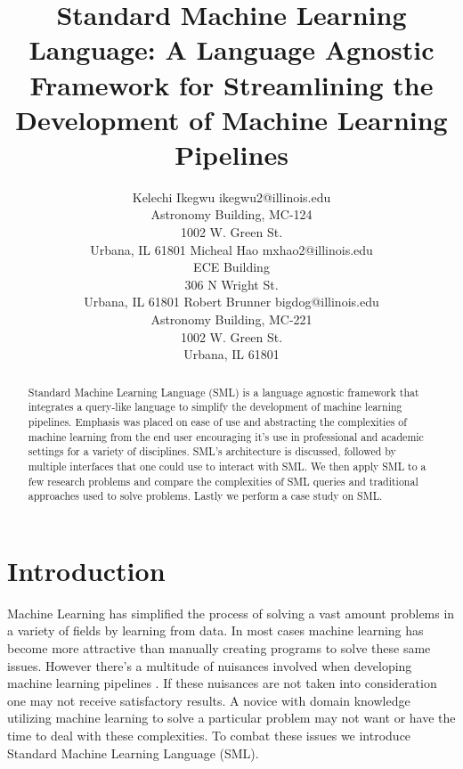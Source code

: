 \documentclass[jair,twoside,11pt,theapa]{article}
\begin{document}
\title{Standard Machine Learning Language: A Language Agnostic Framework for Streamlining the Development of Machine Learning Pipelines}

\author{\name Kelechi Ikegwu \email ikegwu2@illinois.edu \\
        Astronomy Building, MC-124 \\1002 W. Green St.\\ Urbana, IL  61801
       \AND
       \name Micheal Hao  \email mxhao2@illinois.edu \\
       \addr ECE Building \\306 N Wright St. \\ Urbana, IL 61801
       \AND
       \name Robert Brunner \email bigdog@illinois.edu\\
        Astronomy Building, MC-221 \\1002 W. Green St.\\ Urbana, IL  61801}


\maketitle


\begin{abstract}
Standard Machine Learning Language (SML) is a language agnostic framework that integrates a query-like language to simplify the development of machine learning pipelines. Emphasis was placed on ease of use and abstracting the complexities of machine learning from the end user encouraging it's use in professional and academic settings for a variety of disciplines. SML's architecture is discussed, followed by multiple interfaces that one could use to interact with SML. We then apply SML to a few research problems and compare the complexities of SML queries and traditional approaches used to solve problems. Lastly we perform a case study on SML.
\end{abstract}

\section{Introduction}
\label{Introduction}

Machine Learning has simplified the process of solving a vast amount problems in a variety of fields by learning from data. In most cases machine learning has become more attractive than manually creating programs to solve these same issues. However there's a multitude of nuisances involved when developing machine learning pipelines \cite{pedros:fewUsefulThings}. If these nuisances are not taken into consideration one may not receive satisfactory results. A novice with domain knowledge utilizing machine learning to solve a particular problem may not want or have the time to deal with these complexities. To combat these issues we introduce Standard Machine Learning Language (SML).
\end{document}
